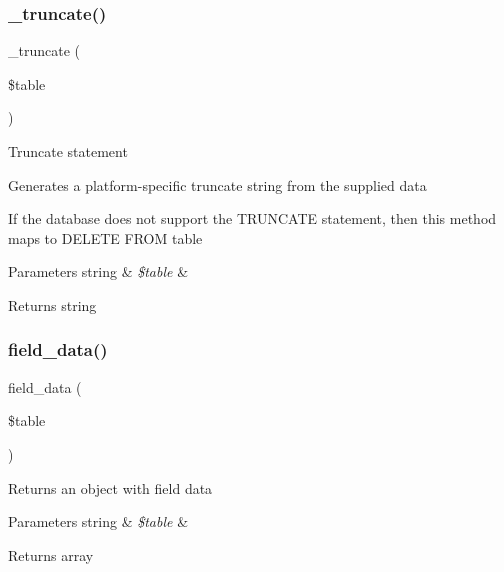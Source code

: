 \subsubsection{\texorpdfstring{\+\_\+truncate()}{\_truncate()}}
{\footnotesize\ttfamily \+\_\+truncate (\begin{DoxyParamCaption}\item[{}]{\$table }\end{DoxyParamCaption})\hspace{0.3cm}{\ttfamily [protected]}}

Truncate statement

Generates a platform-\/specific truncate string from the supplied data

If the database does not support the T\+R\+U\+N\+C\+A\+TE statement, then this method maps to \textquotesingle{}D\+E\+L\+E\+TE F\+R\+OM table\textquotesingle{}


\begin{DoxyParams}[1]{Parameters}
string & {\em \$table} & \\
\hline
\end{DoxyParams}
\begin{DoxyReturn}{Returns}
string 
\end{DoxyReturn}
\mbox{\label{class_c_i___d_b__pdo__cubrid__driver_a90355121e1ed009e0efdbd544ab56efa}} 
\subsubsection{\texorpdfstring{field\+\_\+data()}{field\_data()}}
{\footnotesize\ttfamily field\+\_\+data (\begin{DoxyParamCaption}\item[{}]{\$table }\end{DoxyParamCaption})}

Returns an object with field data


\begin{DoxyParams}[1]{Parameters}
string & {\em \$table} & \\
\hline
\end{DoxyParams}
\begin{DoxyReturn}{Returns}
array 
\end{DoxyReturn}


